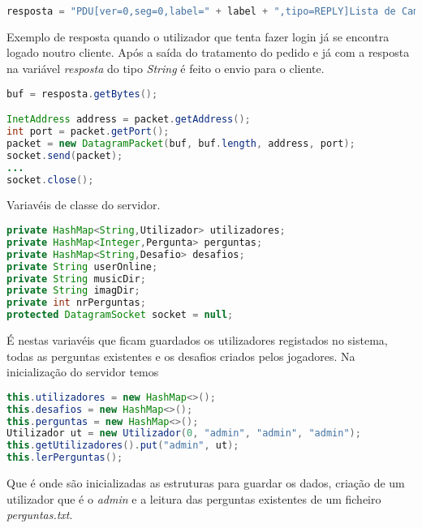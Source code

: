 \documentclass{report}
\begin{document}
\begin{lstlisting}[language=Java]
resposta = "PDU[ver=0,seg=0,label=" + label + ",tipo=REPLY]Lista de Campos:[255=\"Utilizador ja online\"]"; 
\end{lstlisting}
Exemplo de resposta quando o utilizador que tenta fazer login já se encontra logado noutro cliente. Após a saída do tratamento do pedido e já com a resposta na variável \textit{resposta} do tipo \textit{String} é feito o envio para o cliente.
\begin{lstlisting}[language=Java]
buf = resposta.getBytes();

InetAddress address = packet.getAddress();
int port = packet.getPort(); 
packet = new DatagramPacket(buf, buf.length, address, port);
socket.send(packet); 
...
socket.close();
\end{lstlisting}

Variavéis de classe do servidor.
\begin{lstlisting}[language=Java]
private HashMap<String,Utilizador> utilizadores;
private HashMap<Integer,Pergunta> perguntas;
private HashMap<String,Desafio> desafios;
private String userOnline;
private String musicDir;
private String imagDir;
private int nrPerguntas;
protected DatagramSocket socket = null;
\end{lstlisting}
É nestas variavéis que ficam guardados os utilizadores registados no sistema, todas as perguntas existentes e os desafios criados pelos jogadores.
Na inicialização do servidor temos
\begin{lstlisting}[language=Java]
this.utilizadores = new HashMap<>();
this.desafios = new HashMap<>();
this.perguntas = new HashMap<>();
Utilizador ut = new Utilizador(0, "admin", "admin", "admin");
this.getUtilizadores().put("admin", ut);
this.lerPerguntas();
\end{lstlisting}
Que é onde são inicializadas as estruturas para guardar os dados, criação de um utilizador que é o \textit{admin} e a leitura das perguntas existentes de um ficheiro \textit{perguntas.txt}.
\end{document}
